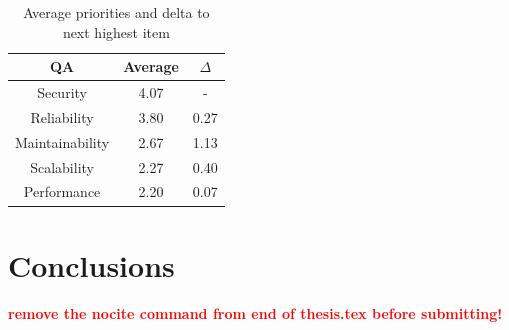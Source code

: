\documentclass[utf8,english]{gradu3}
\newcommand{\todo}[1]{\textbf{\textcolor{red}{#1}}}
\begin{document}
\begin{table}[!h]
  \begin{center}
    \caption{Average priorities and delta to next highest item}
    \label{table:priorities3}
    \begin{tabular}{|c|c|c|}
      \hline
      \textbf{QA}     & \textbf{Average} & \textbf{$\Delta$} \\
      \hline
      Security        & 4.07             & -                 \\
      Reliability     & 3.80             & 0.27              \\
      Maintainability & 2.67             & 1.13              \\
      Scalability     & 2.27             & 0.40              \\
      Performance     & 2.20             & 0.07              \\
      \hline
    \end{tabular}
  \end{center}
\end{table}

\chapter{Conclusions}
\label{chapter:conclusions}


\printbibliography

\nocite{*}
\todo{remove the nocite command from end of thesis.tex before submitting!}

\appendix
\end{document}
